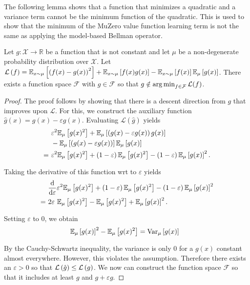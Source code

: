The following lemma shows that a function that minimizes a quadratic and a variance term cannot be the minimum function of the quadratic. This is used to show that the minimum of the MuZero value function learning term is not the same as applying the model-based Bellman operator.

\begin{lemma}
\label{lemma:cvaml:muzero}
Let $g: \mathcal{X} \rightarrow \mathbb{R}$ be a function that is not constant and let $\mu$ be a non-degenerate probability distribution over $\mathcal{X}$. 
Let $\mathcal{L}\left( f \right) = \mathbb{E}_{x\sim\mu}\left[ \left( f(x) - g(x) \right)^2 \right] + \mathbb{E}_{x\sim\mu}\left[ f(x) g(x) \right] - \mathbb{E}_{x\sim\mu}\left[ f(x) \right]\mathbb{E}_\mu\left[ g(x) \right]$.
There exists a function space $\mathcal{F}$ with $g \in \mathcal{F}$ so that $g \notin \operatorname*{arg\,min}_{f \in \mathcal{F}} \mathcal{L}(f)$.
\end{lemma}

\begin{proof}
The proof follows by showing that there is a descent direction from $g$ that improves upon $\mathcal{L}$. For this, we construct the auxiliary function $\hat{g}(x) = g(x) - \varepsilon g(x)$.
Evaluating $\mathcal{L}(\hat{g})$  yields 
\begin{align*}
     &~\varepsilon^2 \mathbb{E}_\mu\left[ g(x)^2 \right] + \mathbb{E}_\mu\left[ \left( g(x) - \varepsilon g(x) \right) g(x) \right] \\
     &~- \mathbb{E}_\mu\left[ \left( g(x) - \varepsilon g(x) \right) \right]\mathbb{E}_\mu\left[ g(x) \right]\\
     =&~\varepsilon^2 \mathbb{E}_\mu\left[ g(x)^2 \right] + \left( 1-\varepsilon \right)\mathbb{E}_\mu\left[ g(x)^2 \right] - \left( 1 - \varepsilon \right) \mathbb{E}_\mu\left[ g(x) \right]^2.
\end{align*}

Taking the derivative of this function wrt to $\varepsilon$ yields
\begin{align*}
     &~\frac{\mathrm{d}}{\mathrm{d} \varepsilon}\varepsilon^2 \mathbb{E}_\mu\left[ g(x)^2 \right] + \left( 1-\varepsilon \right)\mathbb{E}_\mu\left[ g(x)^2 \right] - \left( 1 - \varepsilon \right) \mathbb{E}_\mu\left[ g(x) \right]^2\\
     =&~2\varepsilon~\mathbb{E}_\mu\left[ g(x)^2 \right] -\mathbb{E}_\mu\left[ g(x)^2 \right] + \mathbb{E}_\mu\left[ g(x) \right]^2.
\end{align*}

Setting $\varepsilon$ to 0, we obtain
\begin{align*}
     &~\mathbb{E}_\mu\left[ g(x) \right]^2 - \mathbb{E}_\mu\left[ g(x)^2 \right] = \text{Var}_\mu\left[ g(x) \right]
\end{align*}

By the Cauchy-Schwartz inequality, the variance is only $0$ for a $g(x)$ constant almost everywhere. However, this violates the assumption.
Therefore there exists an $\varepsilon > 0$ so that $\mathcal{L}\left( \hat{g} \right) \leq \mathcal{L}\left( g \right)$.
We now can construct the function space $\mathcal{F}$ so that it includes at least $g$ and $g + \varepsilon g.$

\end{proof}

